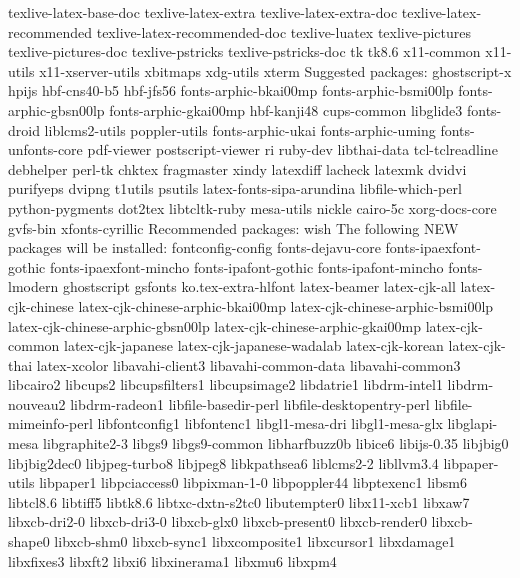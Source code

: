 \begin{reviewemlist}
  texlive{-}latex{-}base{-}doc texlive{-}latex{-}extra texlive{-}latex{-}extra{-}doc
  texlive{-}latex{-}recommended texlive{-}latex{-}recommended{-}doc texlive{-}luatex
  texlive{-}pictures texlive{-}pictures{-}doc texlive{-}pstricks texlive{-}pstricks{-}doc
  tk tk8.6 x11{-}common x11{-}utils x11{-}xserver{-}utils xbitmaps xdg{-}utils xterm
Suggested packages:
  ghostscript{-}x hpijs hbf{-}cns40{-}b5 hbf{-}jfs56 fonts{-}arphic{-}bkai00mp
  fonts{-}arphic{-}bsmi00lp fonts{-}arphic{-}gbsn00lp fonts{-}arphic{-}gkai00mp
  hbf{-}kanji48 cups{-}common libglide3 fonts{-}droid liblcms2{-}utils poppler{-}utils
  fonts{-}arphic{-}ukai fonts{-}arphic{-}uming fonts{-}unfonts{-}core pdf{-}viewer
  postscript{-}viewer ri ruby{-}dev libthai{-}data tcl{-}tclreadline debhelper perl{-}tk
  chktex fragmaster xindy latexdiff lacheck latexmk dvidvi purifyeps dvipng
  t1utils psutils latex{-}fonts{-}sipa{-}arundina libfile{-}which{-}perl python{-}pygments
  dot2tex libtcltk{-}ruby mesa{-}utils nickle cairo{-}5c xorg{-}docs{-}core gvfs{-}bin
  xfonts{-}cyrillic
Recommended packages:
  wish
The following NEW packages will be installed:
  fontconfig{-}config fonts{-}dejavu{-}core fonts{-}ipaexfont{-}gothic
  fonts{-}ipaexfont{-}mincho fonts{-}ipafont{-}gothic fonts{-}ipafont{-}mincho
  fonts{-}lmodern ghostscript gsfonts ko.tex{-}extra{-}hlfont latex{-}beamer
  latex{-}cjk{-}all latex{-}cjk{-}chinese latex{-}cjk{-}chinese{-}arphic{-}bkai00mp
  latex{-}cjk{-}chinese{-}arphic{-}bsmi00lp latex{-}cjk{-}chinese{-}arphic{-}gbsn00lp
  latex{-}cjk{-}chinese{-}arphic{-}gkai00mp latex{-}cjk{-}common latex{-}cjk{-}japanese
  latex{-}cjk{-}japanese{-}wadalab latex{-}cjk{-}korean latex{-}cjk{-}thai latex{-}xcolor
  libavahi{-}client3 libavahi{-}common{-}data libavahi{-}common3 libcairo2 libcups2
  libcupsfilters1 libcupsimage2 libdatrie1 libdrm{-}intel1 libdrm{-}nouveau2
  libdrm{-}radeon1 libfile{-}basedir{-}perl libfile{-}desktopentry{-}perl
  libfile{-}mimeinfo{-}perl libfontconfig1 libfontenc1 libgl1{-}mesa{-}dri
  libgl1{-}mesa{-}glx libglapi{-}mesa libgraphite2{-}3 libgs9 libgs9{-}common
  libharfbuzz0b libice6 libijs{-}0.35 libjbig0 libjbig2dec0 libjpeg{-}turbo8
  libjpeg8 libkpathsea6 liblcms2{-}2 libllvm3.4 libpaper{-}utils libpaper1
  libpciaccess0 libpixman{-}1{-}0 libpoppler44 libptexenc1 libsm6 libtcl8.6
  libtiff5 libtk8.6 libtxc{-}dxtn{-}s2tc0 libutempter0 libx11{-}xcb1 libxaw7
  libxcb{-}dri2{-}0 libxcb{-}dri3{-}0 libxcb{-}glx0 libxcb{-}present0 libxcb{-}render0
  libxcb{-}shape0 libxcb{-}shm0 libxcb{-}sync1 libxcomposite1 libxcursor1
  libxdamage1 libxfixes3 libxft2 libxi6 libxinerama1 libxmu6 libxpm4

\end{reviewemlist}
